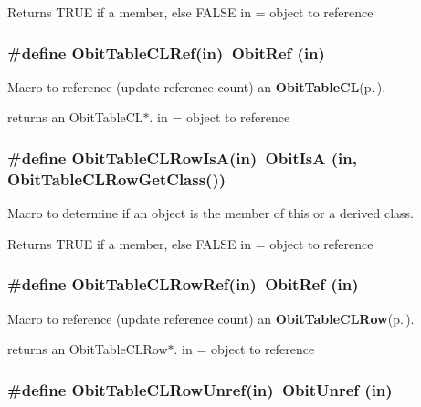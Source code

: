 Returns TRUE if a member, else FALSE in = object to reference 
\subsubsection{\setlength{\rightskip}{0pt plus 5cm}\#define Obit\-Table\-CLRef(in)\ Obit\-Ref (in)}\label{ObitTableCL_8h_a2}


Macro to reference (update reference count) an {\bf Obit\-Table\-CL}{\rm (p.\,\pageref{structObitTableCL})}. 

returns an Obit\-Table\-CL$\ast$. in = object to reference 
\subsubsection{\setlength{\rightskip}{0pt plus 5cm}\#define Obit\-Table\-CLRow\-Is\-A(in)\ Obit\-Is\-A (in, Obit\-Table\-CLRow\-Get\-Class())}\label{ObitTableCL_8h_a6}


Macro to determine if an object is the member of this or a derived class. 

Returns TRUE if a member, else FALSE in = object to reference 
\subsubsection{\setlength{\rightskip}{0pt plus 5cm}\#define Obit\-Table\-CLRow\-Ref(in)\ Obit\-Ref (in)}\label{ObitTableCL_8h_a5}


Macro to reference (update reference count) an {\bf Obit\-Table\-CLRow}{\rm (p.\,\pageref{structObitTableCLRow})}. 

returns an Obit\-Table\-CLRow$\ast$. in = object to reference 
\subsubsection{\setlength{\rightskip}{0pt plus 5cm}\#define Obit\-Table\-CLRow\-Unref(in)\ Obit\-Unref (in)}\label{ObitTableCL_8h_a4}


